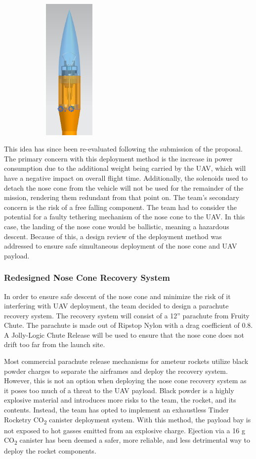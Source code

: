             \includegraphics[width = 7cm, height = 7cm]{img/PL/jet.PNG}
        
            This idea has since been re-evaluated following the submission of the proposal. The primary concern with this deployment method is the increase in power consumption due to the additional weight being carried by the UAV, which will have a negative impact on overall flight time. Additionally, the solenoids used to detach the nose cone from the vehicle will not be used for the remainder of the mission, rendering them redundant from that point on. The team’s secondary concern is the risk of a free falling component. The team had to consider the potential for a faulty tethering mechanism of the nose cone to the UAV. In this case, the landing of the nose cone would be ballistic, meaning a hazardous descent. Because of this, a design review of the deployment method was addressed to ensure safe simultaneous deployment of the nose cone and UAV payload. 

		\subsubsection{Redesigned Nose Cone Recovery System}
        In order to ensure safe descent of the nose cone and minimize the risk of it interfering with UAV deployment, the team decided to design a parachute recovery system. The recovery system will consist of a 12” parachute from Fruity Chute. The parachute is made out of Ripstop Nylon with a drag coefficient of 0.8. A Jolly-Logic Chute Release will be used to ensure that the nose cone does not drift too far from the launch site.

        Most commercial parachute release mechanisms for ameteur rockets utilize black powder charges to separate the airframes and deploy the recovery system. However, this is not an option when deploying the nose cone recovery system as it poses too much of a threat to the UAV payload. Black powder is a highly explosive material and introduces more risks to the team, the rocket, and its contents. Instead, the team has opted to implement an exhaustless Tinder Rocketry CO\textsubscript{2} canister deployment system. With this method, the payload bay is not exposed to hot gasses emitted from an explosive charge. Ejection via a 16 g CO\textsubscript{2} canister has been deemed a safer, more reliable, and less detrimental way to deploy the rocket components. 
        
